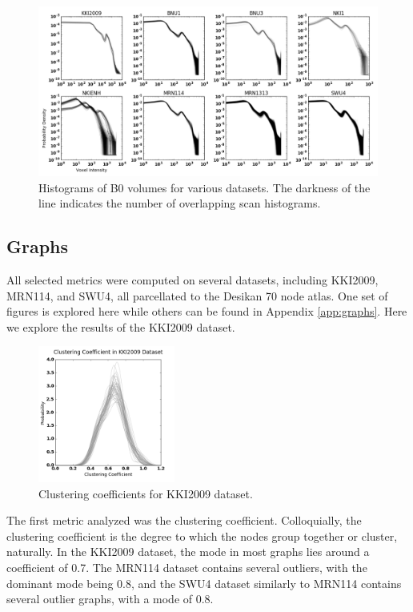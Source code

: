\begin{figure}[h!]
\centering
\includegraphics[width=1\textwidth]{./stats/batcheffects.png}
\makeatletter
\let\@currsize\normalsize
\caption{Histograms of B0 volumes for various datasets. The darkness of the line indicates the number of overlapping scan histograms.}
\label{fig:b0s}
\end{figure}

\subsection{Graphs}
All selected metrics were computed on several datasets, including KKI2009, MRN114, and SWU4, all parcellated to the Desikan 70 node atlas. One set of figures is explored here while others can be found in Appendix \ref{app:graphs}. Here we explore the results of the KKI2009 dataset.

\begin{figure}[h!]
\centering
\includegraphics[width=0.4\textwidth]{./stats/KKI2009-cc.png}
\makeatletter
\let\@currsize\normalsize
\caption{Clustering coefficients for KKI2009 dataset.}
\end{figure}

The first metric analyzed was the clustering coefficient. Colloquially, the clustering coefficient is the degree to which the nodes group together or cluster, naturally. In the KKI2009 dataset, the mode in most graphs lies around a coefficient of 0.7. The MRN114 dataset contains several outliers, with the dominant mode being 0.8, and the SWU4 dataset similarly to MRN114 contains several outlier graphs, with a mode of 0.8.


